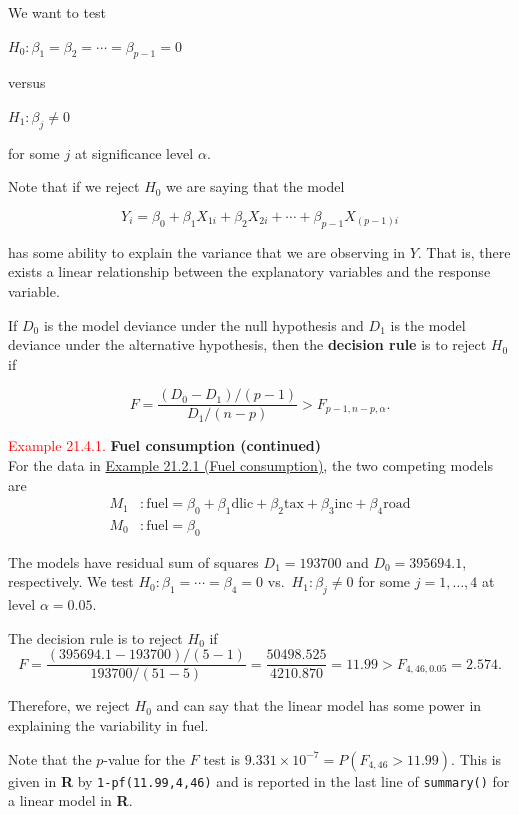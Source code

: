 \documentclass[
]{book}
\begin{document}
We want to test

\(H_0: \beta_1 = \beta_2 = \cdots = \beta_{p-1} = 0\)

versus

\(H_1: \beta_j \neq 0\)

for some \(j\) at significance level \(\alpha\).

Note that if we reject \(H_0\) we are saying that the model

\[Y_i = \beta_0 + \beta_1 X_{1i}+ \beta_2 X_{2i} + \cdots + \beta_{p-1} X_{(p-1)i}\]

has some ability to explain the variance that we are observing in \(Y\). That is, there exists a linear relationship between the explanatory variables and the response variable.

If \(D_0\) is the model deviance under the null hypothesis and \(D_1\) is the model deviance under the alternative hypothesis, then the {\textbf{decision rule}} is to reject \(H_0\) if

\[ F = \frac{(D_0 - D_1)/(p-1)}{D_1/(n-p)} > F_{p-1,n-p,\alpha}.\]

\hypertarget{Sec_Linear_hypo_test:ex:fuel_exIII}{}
\textcolor{red}{Example 21.4.1.}
{\textbf{Fuel consumption (continued)}}\\
For the data in \href{Sec_Linear_hypo_test:ex:fuel_ex}{Example 21.2.1 (Fuel consumption)}, the two competing models are\\

\begin{align*}
M_1&: \text{fuel} = \beta_0 + \beta_1 \text{dlic} + \beta_2 \text{tax} + \beta_3 \text{inc} + \beta_4 \text{road} \\
M_0&: \text{fuel} = \beta_0
\end{align*}

The models have residual sum of squares \(D_1 = 193700\) and \(D_0 = 395694.1\), respectively. We test \(H_0: \beta_1 = \cdots = \beta_4 = 0\) vs.~\(H_1: \beta_j \neq 0\) for some \(j=1,\dots,4\) at level \(\alpha=0.05\).

\hfill\break

The decision rule is to reject \(H_0\) if\\

\[F = \frac{(395694.1-193700)/(5-1)}{193700/(51-5)} = \frac{50498.525}{4210.870}= 11.99 > F_{4,46,0.05} = 2.574.\]

Therefore, we reject \(H_0\) and can say that the linear model has some power in explaining the variability in fuel.

Note that the \(p\)-value for the \(F\) test is \(9.331 \times 10^{-7} = P(F_{4,46} >11.99)\). This is given in \textbf{R} by \texttt{1-pf(11.99,4,46)} and is reported in the last line of \texttt{summary()} for a linear model in \textbf{R}.
\end{document}
